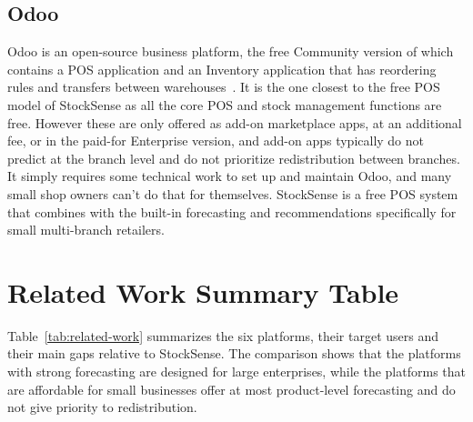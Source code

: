 \documentclass{StockSense}
\begin{document}
\subsection{Odoo}

Odoo is an open-source business platform, the free Community version of which contains a POS application and an Inventory application that has reordering rules and transfers between warehouses~\cite{odoo}. It is the one closest to the free POS model of StockSense as all the core POS and stock management functions are free. However these are only offered as add-on marketplace apps, at an additional fee, or in the paid-for Enterprise version, and add-on apps typically do not predict at the branch level and do not prioritize redistribution between branches. It simply requires some technical work to set up and maintain Odoo, and many small shop owners can't do that for themselves. StockSense is a free POS system that combines with the built-in forecasting and recommendations specifically for small multi-branch retailers.

\section{Related Work Summary Table}

Table~\ref{tab:related-work} summarizes the six platforms, their target users and their main gaps relative to StockSense. The comparison shows that the platforms with strong forecasting are designed for large enterprises, while the platforms that are affordable for small businesses offer at most product-level forecasting and do not give priority to redistribution.
\end{document}

